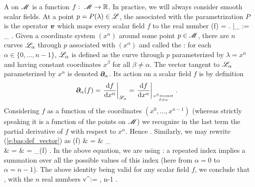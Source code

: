A  on $\mathscr{M}$ is a function
$f:\ \mathscr{M} \rightarrow \mathbb{R}$. In practice, we will always consider smooth scalar fields. At a point $p=P(\lambda)\in\mathscr{L}$, the  associated with the parametrization
$P$ is the operator $\bm{v}$ which maps every scalar field $f$ to the real number
\be \label{e:bas:def_vector}
  (f) = \left.  \right|_{\Li} :=
  \lim_{\varepsilon{}} 
   .
\ee
Given a coordinate system $(x^\alpha)$ around some point $p\in\mathscr{M}$, there are
$n$ curves $\mathscr{L}_\alpha$ through $p$ associated with $(x^\alpha)$ and called the
:
for each $\alpha\in\{0,\ldots,n-1\}$, $\mathscr{L}_\alpha$ is defined as the curve through $p$ parameterized by $\lambda = x^\alpha$ and having constant coordinates
$x^\beta$ for all $\beta\not=\alpha$.
The vector tangent to $\mathscr{L}_\alpha$ parameterized by $x^\alpha$ is
denoted $\bm{\partial}_\alpha$. Its action on a scalar field $f$ is by definition
\[
  \bm{\partial}_\alpha(f) =
  \left. \frac{\mathrm{d} f}{\mathrm{d} x^\alpha} \right|_{\mathscr{L}_\alpha}
  = \left. \frac{\mathrm{d} f}{\mathrm{d} x^\alpha} \right|_{x^\beta={\rm const}\atop \beta\not=\alpha} .
\]
Considering $f$ as a function of
the coordinates $(x^0,\ldots,x^{n-1})$ (whereas strictly speaking it is a function
of the points on $\mathscr{M}$) we recognize in the last term the partial derivative of
$f$ with respect to $x^\alpha$. Hence
\be \label{e:bas:wpar_partial}
  .
\ee
Similarly, we may rewrite (\ref{e:bas:def_vector}) as
\bea
  (f) & = & \lim_{\varepsilon{}} 
   \nonumber \\
  & = &  
  = \wpar_\alpha(f)  . \nonumber
\eea
In the above equation,
we are using : a repeated index implies a summation over all the possible values of this index
(here from $\alpha=0$ to $\alpha=n-1$).
The above identity being valid for any scalar field $f$, we conclude that
\be \label{e:bas:v_va_wpar_a}
   ,
\ee
with the $n$ real numbers
\be \label{e:bas:va_dXadlamb}
  v^\alpha :=  ,  \leq \alpha\leq n-1 .
